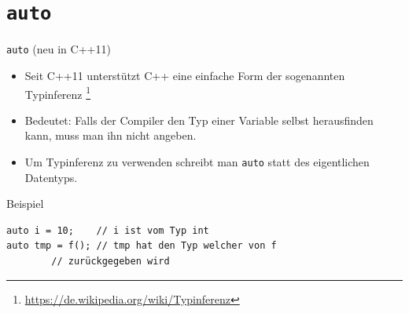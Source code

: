 \documentclass[presentation]{beamer}
\begin{document}
\section{\texttt{auto}}
\label{sec:org6288ac0}
\begin{frame}[label={sec:orge4f499c},fragile]{{\color{solarizedYellow}\texttt{auto}} (neu in C++11)}
 \begin{itemize}
\item Seit C++11 unterstützt C++ eine einfache Form der sogenannten
\alert{Typinferenz} \footnote{\href{https://de.wikipedia.org/wiki/Typinferenz}{https://de.wikipedia.org/wiki/Typinferenz}}
\item Bedeutet: Falls der Compiler den Typ einer Variable selbst
herausfinden kann, muss man ihn nicht angeben.
\item Um Typinferenz zu verwenden schreibt man {\color{solarizedYellow}\verb!auto!} statt des
eigentlichen Datentyps.
\end{itemize}
\begin{block}{Beispiel}
\begin{verbatim}
auto i = 10;    // i ist vom Typ int
auto tmp = f(); // tmp hat den Typ welcher von f
		// zurückgegeben wird
\end{verbatim}
\end{block}
\end{frame}
\end{document}
